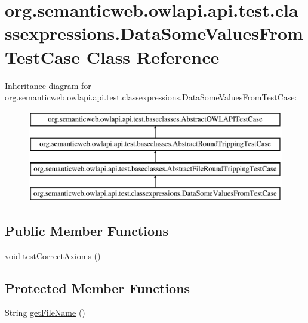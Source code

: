 \hypertarget{classorg_1_1semanticweb_1_1owlapi_1_1api_1_1test_1_1classexpressions_1_1_data_some_values_from_test_case}{\section{org.\-semanticweb.\-owlapi.\-api.\-test.\-classexpressions.\-Data\-Some\-Values\-From\-Test\-Case Class Reference}
\label{classorg_1_1semanticweb_1_1owlapi_1_1api_1_1test_1_1classexpressions_1_1_data_some_values_from_test_case}
}
Inheritance diagram for org.\-semanticweb.\-owlapi.\-api.\-test.\-classexpressions.\-Data\-Some\-Values\-From\-Test\-Case\-:\begin{figure}[H]
\begin{center}
\leavevmode
\includegraphics[height=4.000000cm]{classorg_1_1semanticweb_1_1owlapi_1_1api_1_1test_1_1classexpressions_1_1_data_some_values_from_test_case}
\end{center}
\end{figure}
\subsection*{Public Member Functions}
\begin{DoxyCompactItemize}
\item 
void \hyperlink{classorg_1_1semanticweb_1_1owlapi_1_1api_1_1test_1_1classexpressions_1_1_data_some_values_from_test_case_ab47251d2b81544185a3dfbedc048ad6d}{test\-Correct\-Axioms} ()
\end{DoxyCompactItemize}
\subsection*{Protected Member Functions}
\begin{DoxyCompactItemize}
\item 
String \hyperlink{classorg_1_1semanticweb_1_1owlapi_1_1api_1_1test_1_1classexpressions_1_1_data_some_values_from_test_case_a73a2af1c4a28fb44f8dedbb6d311ef0a}{get\-File\-Name} ()
\end{DoxyCompactItemize}


